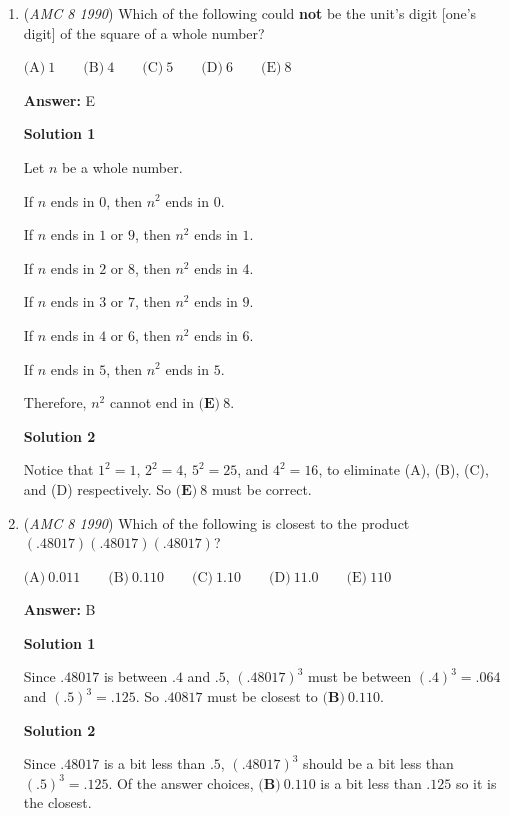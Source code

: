 \begin{enumerate}
 


	\item (\textit{AMC 8 1990}) Which of the following could \textbf{not} be the unit's digit [one's digit] of the square of a whole number?


 $\text{(A)}\ 1 \qquad \text{(B)}\ 4 \qquad \text{(C)}\ 5 \qquad \text{(D)}\ 6 \qquad \text{(E)}\ 8$

 \textbf{Answer: }E



\textbf{Solution 1}

Let $n$ be a whole number.

 If $n$ ends in $0$, then $n^2$ ends in $0$.

 If $n$ ends in $1$ or $9$, then $n^2$ ends in $1$.

 If $n$ ends in $2$ or $8$, then $n^2$ ends in $4$.

 If $n$ ends in $3$ or $7$, then $n^2$ ends in $9$.

 If $n$ ends in $4$ or $6$, then $n^2$ ends in $6$.

 If $n$ ends in $5$, then $n^2$ ends in $5$.

 Therefore, $n^2$ cannot end in $\boxed{\textbf{(E)}\ 8}$.

 



\textbf{Solution 2}

Notice that $1^2=1$, $2^2=4$, $5^2=25$, and $4^2=16$, to eliminate (A), (B), (C), and (D) respectively.  So $\boxed{\textbf{(E)}\ 8}$ must be correct.

 


	\item (\textit{AMC 8 1990}) Which of the following is closest to the product $(.48017)(.48017)(.48017)$?


 $\text{(A)}\ 0.011 \qquad \text{(B)}\ 0.110 \qquad \text{(C)}\ 1.10 \qquad \text{(D)}\ 11.0 \qquad \text{(E)}\ 110$

 \textbf{Answer: }B



\textbf{Solution 1}

Since $.48017$ is between $.4$ and $.5$, $(.48017)^3$ must be between $(.4)^3 = .064$ and $(.5)^3 = .125$.  So $.40817$ must be closest to $\boxed{\textbf{(B)}\ 0.110}$.

 



\textbf{Solution 2}

Since $.48017$ is a bit less than $.5$, $(.48017)^3$ should be a bit less than $(.5)^3 = .125$.  Of the answer choices, $\boxed{\textbf{(B)}\ 0.110}$ is a bit less than $.125$ so it is the closest.


\end{enumerate}
